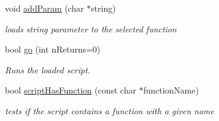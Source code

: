 \begin{CompactItemize}
void \hyperlink{classEOSLuaScript_9a6e58cbb890391a8eb34cf22a0e7cfd}{addParam} (char $\ast$string)
\begin{CompactList}\small\item\em loads string parameter to the selected function \item\end{CompactList}\item 
bool \hyperlink{classEOSLuaScript_6d24519473b5a583d3ce89252a11e0ce}{go} (int nReturns=0)
\begin{CompactList}\small\item\em Runs the loaded script. \item\end{CompactList}\item 
bool \hyperlink{classEOSLuaScript_466d88c9afeec258536cd069b811f325}{scriptHasFunction} (const char $\ast$functionName)
\begin{CompactList}\small\item\em tests if the script contains a function with a given name \item\end{CompactList}\end{CompactItemize}
